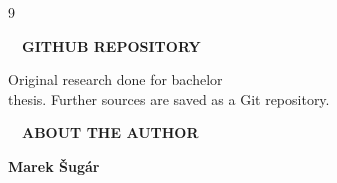 \documentclass[
portrait,
a0paper%
]
{baposter}
\begin{document}
\begin{poster}
{\begin{minipage}[t][3.6cm]{.32\textwidth}
\begin{thebibliography}{9}
\begin{tiny}
	  \end{tiny}
	\end{thebibliography} 
  \end{minipage}
  \hfill\vline\hfill
  \begin{minipage}[t][3.6cm]{.32\textwidth}
	\vspace{0.3cm}
  $\quad$\textbf{\small\color{cernblue}GITHUB REPOSITORY} \vspace{0.15cm}\\ 
	\begin{minipage}{.35\textwidth}
	  \begin{center}
	  \end{center}
	\end{minipage}
	\begin{minipage}{.64\textwidth} 
    \vspace{.3cm}
	  \color{cernblue}
	  \footnotesize
    Original research done for bachelor \\ 
    thesis. Further sources are saved as a Git repository.
	\end{minipage}
	\vspace{0.25cm}
	\color{cernblue}
	\small
  \end{minipage}
  \hfill\vline\hfill
  \begin{minipage}[t][3.6cm]{.32\textwidth}
  \vspace{0.3cm}
  $\quad$\textbf{\small\color{cernblue}ABOUT THE AUTHOR} \vspace{0.15cm}\\ 
	\begin{minipage}{.35\textwidth}
	  \begin{center}
	  \end{center}
	\end{minipage}
	\begin{minipage}{.64\textwidth} 
    \vspace{.3cm}
	  \color{cernblue}
	  \footnotesize
	  \textbf{Marek Šugár}\\

\end{minipage}
\end{minipage}}
\end{poster}
\end{document}

